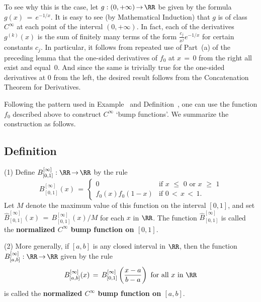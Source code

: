         To see why this is the case, let $g:(0,+{\infty}) \,{\rightarrow}\, {\RR}$ be given by the formula $g(x) \,=\, e^{-1/x}$.
    It is easy to see (by Mathematical Induction) that $g$ is of class $C^{{\infty}}$ at each point of the interval $(0,+{\infty})$.
    In fact, each of the derivatives $g^{(k)}(x)$ is the sum of finitely many terms of the form ${\displaystyle \frac{c_{j}}{x^{j}}e^{-1/x}}$ for certain constants $c_{j}$.
    In particular, it follows from repeated use of Part~(a) of the preceding lemma that the one-sided derivatives of $f_{0}$ at $x \,=\, 0$ from the right all exist and equal~$0$.
    And since the same is trivially true for the one-sided derivatives at $0$ from the left,
    the desired result follows from the Concatenation Theorem for Derivatives.

\V

        Following the pattern used in Example~ and Definition~, one can use the function $f_{0}$ described above to construct $C^{{\infty}}$ `bump functions'.
    We summarize the construction as follows.

\V
             \subsection{\small{\bf Definition}}
            \label{DefE45.127K}

\V

\hspace*{\parindent}(1) Define $B^{[{\infty}]}_{[0,1]}:{\RR} \,{\rightarrow}\, {\RR}$ by the rule
        \begin{displaymath}
        B^{[{\infty}]}_{[0,1]}(x)  \,=\, \left\{
        \begin{array}{cl}
        0 & \mbox{if $x\,\,{\leq}\,\,0$ or $x\,\,{\geq}\,\,1$} \\
        f_{0}(x)f_{0}(1-x) & \mbox{if $0\,<\,x\,<\,1$}.
        \end{array}
                           \right.
        \end{displaymath}
    Let $M$ denote the maximum value of this function on the interval $[0,1]$, and set $\hat{B}^{[{\infty}]}_{[0,1]}(x) \,=\, B^{[{\infty}]}_{[0,1]}(x)/M$ for each $x$ in ${\RR}$.
    The function $\hat{B}^{[{\infty}]}_{[0,1]}$ is called the {\bf normalized $C^{{\infty}}$ bump function on $[0,1]$}.

\V

        (2) More generally, if $[a,b]$ is any closed interval in ${\RR}$, then the function $B^{[{\infty}]}_{[a,b]}:{\RR} \,{\rightarrow}\, {\RR}$ given by the rule
        \begin{displaymath}
        B^{[{\infty}]}_{[a,b]}(x) \,=\, B^{[{\infty}]}_{[0,1]}\left(\frac{x-a}{b-a}\right) \mbox{ for all $x$ in ${\RR}$}
        \end{displaymath}
    is called the {\bf normalized $C^{{\infty}}$ bump function on $[a,b]$}.

